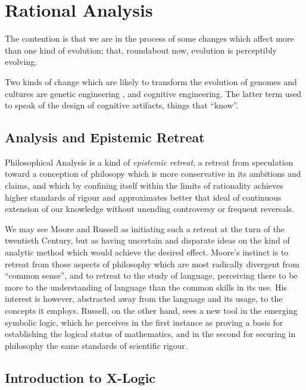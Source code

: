 
\newtheorem{iprin}{I}

\part{Rational Analysis}\label{partIV}

The contention is that we are in the process of some changes which affect more than one kind of evolution; that, roundabout now, evolution is perceptibly evolving.

Two kinds of change which are likely to transform the evolution of genomes and cultures are genetic engineering , and cognitive engineering.
The latter term used to speak of the design of cognitive artifacts, things that ``know''.

\chapter{Analysis and Epistemic Retreat}

Philosophical Analysis is a kind of \emph{epistemic retreat}, a retreat from speculation toward a conception of philosopy which is more conservative in its ambitions and claims, and which by confining itself within the limits of rationality achieves higher standards of rigour and approximates better that ideal of continuous extension of our knowledge without unending controversy or frequent reversals.

We may see Moore and Russell as initiating such a retreat at the turn of the twentieth Century, but as having uncertain and disparate ideas on the kind of analytic method which would achieve the desired effect.
Moore's instinct is to retreat from those aspects of philosophy which are most radically divergent from ``common sense'', and to retreat to the study of language, perceiving there to be more to the understanding of language than the common skills in its use.
His interest is however, abstracted away from the language and its usage, to the concepts it employs.
Russell, on the other hand, sees a new tool in the emerging symbolic logic, which he perceives in the first instance as proving a basis for establishing the logical status of mathematics, and in the second for securing in philosophy the same standards of scientific rigour.

\chapter{Introduction to X-Logic}


